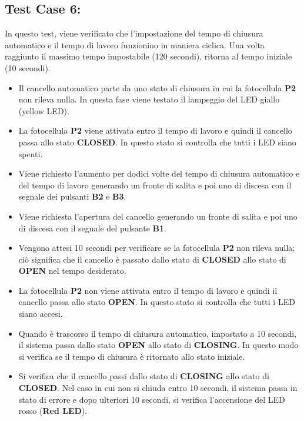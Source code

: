 \documentclass[12pt]{article}
\begin{document}
\newpage
\subsection{Test Case 6: }
In questo test, viene verificato che l'impostazione del tempo di chiusura automatico e il tempo di lavoro funzionino in maniera ciclica. Una volta raggiunto il massimo tempo impostabile (120 secondi), ritorna al tempo iniziale (10 secondi).

\begin{itemize}

    \item Il cancello automatico parte da uno stato di chiusura in cui la fotocellula \textbf{P2} non rileva nulla. In questa fase viene testato il lampeggio del LED giallo (yellow LED).
    \item La fotocellula \textbf{P2} viene attivata entro il tempo di lavoro e quindi il cancello passa allo stato \textbf{CLOSED}. In questo stato si controlla che tutti i LED siano spenti.
    \item Viene richiesto l'aumento per dodici volte del tempo di chiusura automatico e del tempo di lavoro generando un fronte di salita e poi uno di discesa con il segnale dei pulsanti \textbf{B2} e \textbf{B3}.
    \item Viene richiesta l’apertura del cancello generando un fronte di salita e poi uno di discesa con il segnale del pulsante \textbf{B1}.
    \item Vengono attesi 10 secondi per verificare se la fotocellula \textbf{P2} non rileva nulla; ciò significa che il cancello è passato dallo stato di \textbf{CLOSED} allo stato di \textbf{OPEN} nel tempo desiderato.
    \item La fotocellula \textbf{P2} non viene attivata entro il tempo di lavoro e quindi il cancello passa allo stato \textbf{OPEN}. In questo stato si controlla che tutti i LED siano accesi.
    \item Quando è trascorso il tempo di chiusura automatico, impostato a 10 secondi, il sistema passa dallo stato \textbf{OPEN} allo stato di \textbf{CLOSING}. In questo modo si verifica se il tempo di chiusura è ritornato allo stato iniziale.
    \item Si verifica che il cancello passi dallo stato di \textbf{CLOSING} allo stato di \textbf{CLOSED}. Nel caso in cui non si chiuda entro 10 secondi, il sistema passa in stato di errore e dopo ulteriori 10 secondi, si verifica l'accensione del LED rosso (\textbf{Red LED}).

\end{itemize}
\end{document}

